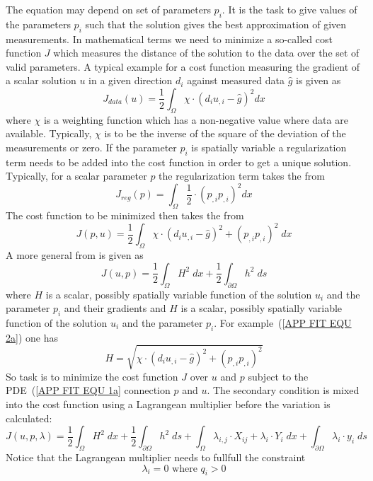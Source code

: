 The equation may depend on set of parameters $p_i$. It is the task to 
give values of the parameters $p_i$ such that the solution gives the best 
approximation of given measurements. In mathematical terms we need to minimize
a so-called cost function $J$ which measures the distance of the solution
to the data over the set of valid parameters. A typical example 
for a cost function measuring the gradient of a scalar solution $u$ 
in a given direction $d_i$ against measured data $\hat{g}$ is given as
\begin{equation}\label{APP FIT EQU 2a}
J_{data}(u) = \frac{1}{2}\int_{\Omega}  \chi \cdot ( d_i u_{,i} - \hat{g})^2 dx
\end{equation} 
where $\chi$ is a weighting function which has a non-negative value where data are available. 
Typically, $\chi$ is to be the inverse of the square of the deviation of the measurements or zero.
If the parameter $p_i$ is spatially variable a regularization term needs to be
added into the cost function in order to get a unique solution. Typically,
for a scalar parameter $p$ the regularization term takes the from
\begin{equation}\label{APP FIT EQU 3}
J_{reg}(p) =  \int_{\Omega} \frac{1}{2} \cdot (p_{,i}p_{,i})^{2} dx
\end{equation} 
The cost function to be minimized then takes the from
\begin{equation}\label{APP FIT EQU 2a}
J(p,u) = \frac{1}{2}\int_{\Omega}  \chi \cdot ( d_i u_{,i} - \hat{g})^2
+ (p_{,i}p_{,i})^{2} \;
dx
\end{equation} 
A more general from is given as 
\begin{equation}\label{APP FIT EQU 4}
J(u,p) = \frac{1}{2} \int_{\Omega} H^2\; dx + \frac{1}{2} \int_{\partial \Omega} h^2 \; ds
\end{equation} 
where $H$ is a scalar, possibly spatially variable  function 
of the solution $u_i$ and the parameter $p_i$ and their gradients
and  $H$ is a scalar, possibly spatially variable  function 
of the solution $u_i$ and the parameter $p_i$. For example~(\ref{APP FIT EQU 2a})
one has
\begin{equation}\label{APP FIT EQU 2a}
H = \sqrt{ \chi \cdot (d_i u_{,i} - \hat{g})^2
+ (p_{,i}p_{,i})^{2} }
\end{equation} 
So task is to minimize the cost function $J$ over $u$ and $p$  
subject to the PDE~(\ref{APP FIT EQU 1a} connection $p$ and $u$. The secondary condition
is mixed into the cost function using a Lagrangean multiplier before the variation is calculated:
\begin{equation}\label{APP FIT EQU 5}
J(u,p,\lambda) = \frac{1}{2} \int_{\Omega} H^2 \; dx + \frac{1}{2} \int_{\partial \Omega} h^2 \; ds
+ \int_{\Omega} \lambda_{i,j} \cdot X_{ij} + \lambda_{i} \cdot Y_{i} \; dx
+ \int_{\partial \Omega}  \lambda_{i} \cdot y_{i} \; ds
\end{equation}
Notice that the Lagrangean multiplier needs to fullfull the constraint
\begin{equation} \label{APP FIT EQU 1b}
\lambda_{i}=0 \mbox{ where } q_i>0
\end{equation}

